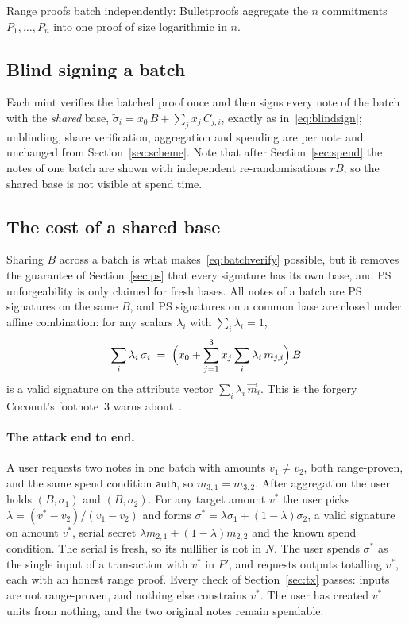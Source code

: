 \documentclass[10pt,a5paper]{article}
\newcommand{\K}[1]{#1}                      %
\newcommand{\Go}[1]{#1}                     %
\newcommand{\K}[1]{{\color{ScalarCol}#1}}   %
\newcommand{\Go}[1]{{\color{GoneCol}#1}}    %
\newcommand{\auth}{\mathsf{auth}}
\newcommand{\vv}[1]{\vec{#1}}
\begin{document}
Range proofs batch independently: Bulletproofs aggregate the $n$ commitments
$\Go{P_1},\dots,\Go{P_n}$ into one proof of size logarithmic in $n$.

\subsection{Blind signing a batch}

Each mint verifies the batched proof once and then signs every note of the
batch with the \emph{shared} base,
$\Go{\widetilde{\sigma}_i} = \K{x_0}\,\Go{B} + \sum_j \K{x_j}\,\Go{C_{j,i}}$,
exactly as in~\eqref{eq:blindsign}; unblinding, share verification,
aggregation and spending are per note and unchanged from
Section~\ref{sec:scheme}. Note that after Section~\ref{sec:spend} the notes of
one batch are shown with independent re-randomisations $\K{r}\Go{B}$, so the
shared base is not visible at spend time.

\subsection{The cost of a shared base}
\label{sec:sharedh}

Sharing $\Go{B}$ across a batch is what makes~\eqref{eq:batchverify} possible,
but it removes the guarantee of Section~\ref{sec:ps} that every signature has
its own base, and PS unforgeability is only claimed for fresh bases. All notes
of a batch are PS signatures on the same $\Go{B}$, and PS signatures on a
common base are closed under affine combination: for any scalars
$\K{\lambda_i}$ with $\sum_i \K{\lambda_i} = 1$,
\begin{equation}
  \sum_{i} \K{\lambda_i}\,\Go{\sigma_i}
  \;=\; \Bigl(\K{x_0} + \sum_{j=1}^{3} \K{x_j} \sum_i \K{\lambda_i}\,\K{m_{j,i}}\Bigr)\,\Go{B}
  \label{eq:affine}
\end{equation}
is a valid signature on the attribute vector $\sum_i \K{\lambda_i}\,\vv{m}_i$.
This is the forgery Coconut's footnote~3 warns about~\cite{coconut}.

\paragraph{The attack end to end.} A user requests two notes in one batch with
amounts $\K{v_1} \ne \K{v_2}$, both range-proven, and the same spend condition
$\auth$, so $\K{m_{3,1}} = \K{m_{3,2}}$. After aggregation the user holds
$(\Go{B},\Go{\sigma_1})$ and $(\Go{B},\Go{\sigma_2})$. For any target amount
$\K{v^*}$ the user picks $\K{\lambda} = (\K{v^*} - \K{v_2})/(\K{v_1} - \K{v_2})$
and forms $\Go{\sigma^*} = \K{\lambda}\Go{\sigma_1} + (1-\K{\lambda})\Go{\sigma_2}$,
a valid signature on amount $\K{v^*}$, serial secret
$\K{\lambda}\K{m_{2,1}} + (1-\K{\lambda})\K{m_{2,2}}$ and the known spend
condition. The serial is fresh, so its nullifier is not in $N$. The user spends
$\Go{\sigma^*}$ as the single input of a transaction with $\K{v^*}$ in
$\Go{P'}$, and requests outputs totalling $\K{v^*}$, each with an honest range
proof. Every check of Section~\ref{sec:tx} passes: inputs are not range-proven,
and nothing else constrains $\K{v^*}$. The user has created $\K{v^*}$ units
from nothing, and the two original notes remain spendable.
\end{document}
